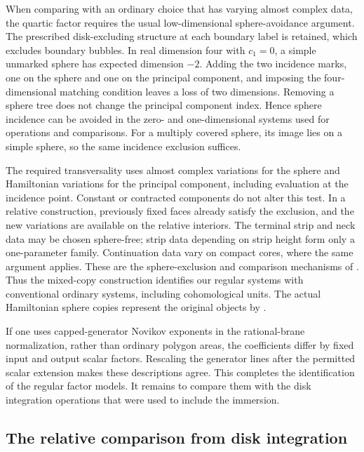 \documentclass[11pt]{article}
\numberwithin{equation}{section}
\theoremstyle{definition}
\theoremstyle{remark}
\begin{document}
When comparing with an ordinary choice that has varying almost
complex data, the quartic factor requires the usual low-dimensional
sphere-avoidance argument.  The prescribed disk-excluding structure
at each boundary label is retained, which excludes boundary bubbles.
In real dimension four with $c_1=0$, a simple unmarked sphere has
expected dimension $-2$.  Adding the two incidence marks, one on
the sphere and one on the principal component, and imposing the
four-dimensional matching condition leaves a loss of two dimensions.
Removing a sphere tree does not change the principal component
index.  Hence sphere incidence can be avoided in the zero- and
one-dimensional systems used for operations and comparisons.  For
a multiply covered sphere, its image lies on a simple sphere, so the
same incidence exclusion suffices.

The required transversality uses almost complex variations for the
sphere and Hamiltonian variations for the principal component,
including evaluation at the incidence point.  Constant or contracted
components do not alter this test.  In a relative construction,
previously fixed faces already satisfy the exclusion, and the new
variations are available on the relative interiors.  The terminal
strip and neck data may be chosen sphere-free; strip data depending
on strip height form only a one-parameter family.  Continuation data
vary on compact cores, where the same argument applies.  These are
the sphere-exclusion and comparison mechanisms of
\cite[Section~8]{SeidelQuartic}.  Thus the mixed-copy construction
identifies our regular systems with conventional ordinary systems,
including cohomological units.  The actual Hamiltonian sphere copies
represent the original objects by
\cite[Lemma~8.14]{SeidelQuartic}.

If one uses capped-generator Novikov exponents in the rational-brane
normalization, rather than ordinary polygon areas, the coefficients
differ by fixed input and output scalar factors.  Rescaling the
generator lines after the permitted scalar extension makes these
descriptions agree.  This completes the identification of the
regular factor models.  It remains to compare them with the disk
integration operations that were used to include the immersion.

\subsection{The relative comparison from disk integration}
\label{comp:virtual}
\end{document}
